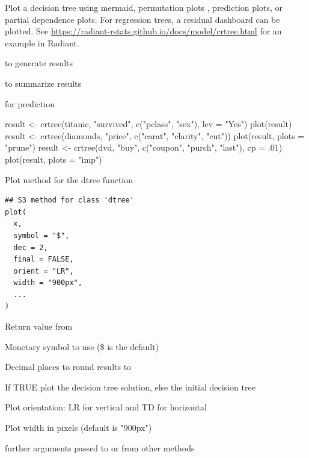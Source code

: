 \documentclass[a4paper]{book}
\begin{document}
%
\begin{Details}
Plot a decision tree using mermaid, permutation plots , prediction plots, or partial dependence plots. For regression trees, a residual dashboard can be plotted. See \url{https://radiant-rstats.github.io/docs/model/crtree.html} for an example in Radiant.
\end{Details}
%
\begin{SeeAlso}
 to generate results

 to summarize results

 for prediction
\end{SeeAlso}
%
\begin{Examples}
\begin{ExampleCode}
result <- crtree(titanic, "survived", c("pclass", "sex"), lev = "Yes")
plot(result)
result <- crtree(diamonds, "price", c("carat", "clarity", "cut"))
plot(result, plots = "prune")
result <- crtree(dvd, "buy", c("coupon", "purch", "last"), cp = .01)
plot(result, plots = "imp")

\end{ExampleCode}
\end{Examples}
%
\begin{Description}
Plot method for the dtree function
\end{Description}
%
\begin{Usage}
\begin{verbatim}
## S3 method for class 'dtree'
plot(
  x,
  symbol = "$",
  dec = 2,
  final = FALSE,
  orient = "LR",
  width = "900px",
  ...
)
\end{verbatim}
\end{Usage}
%
\begin{Arguments}
\begin{ldescription}
\item[\code{x}] Return value from 

\item[\code{symbol}] Monetary symbol to use (\$ is the default)

\item[\code{dec}] Decimal places to round results to

\item[\code{final}] If TRUE plot the decision tree solution, else the initial decision tree

\item[\code{orient}] Plot orientation: LR for vertical and TD for horizontal

\item[\code{width}] Plot width in pixels (default is "900px")

\item[\code{...}] further arguments passed to or from other methods
\end{ldescription}
\end{Arguments}
\end{document}
